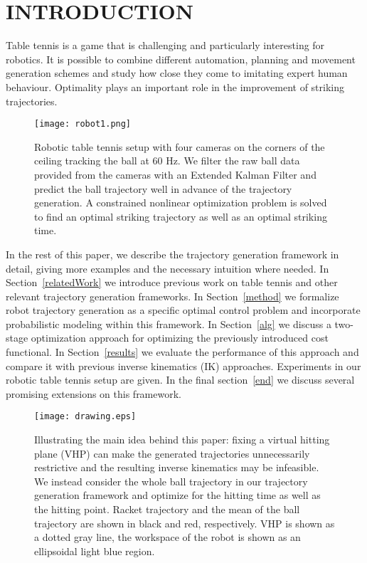 \section{INTRODUCTION}

Table tennis is a game that is challenging and particularly interesting for robotics. It is possible to combine different automation, planning and movement generation schemes and study how close they come to imitating expert human behaviour. Optimality plays an important role in the improvement of striking trajectories.

\begin{figure}[t!]
\center
\texttt{[image: robot1.png]}			
\caption{Robotic table tennis setup with four cameras on the corners of the ceiling tracking the ball at 60 Hz. We filter the raw ball data provided from the cameras with an Extended Kalman Filter and predict the ball trajectory well in advance of the trajectory generation. A constrained nonlinear optimization problem is solved to find an optimal striking trajectory as well as an optimal striking time.}
\label{robot}
\end{figure}

In the rest of this paper, we describe the trajectory generation framework in detail, giving more examples and the necessary intuition where needed. In Section~\ref{relatedWork} we introduce previous work on table tennis and other relevant trajectory generation frameworks. In Section~\ref{method} we formalize robot trajectory generation as a specific optimal control problem and incorporate probabilistic modeling within this framework. In Section~\ref{alg} we discuss a two-stage optimization approach for optimizing the previously introduced cost functional. In Section~\ref{results} we evaluate the performance of this approach and compare it with previous inverse kinematics (IK) approaches. Experiments in our robotic table tennis setup are given. In the final section~\ref{end} we discuss several promising extensions on this framework. %

\begin{figure}[t!]
\centering
\texttt{[image: drawing.eps]}			
\caption{Illustrating the main idea behind this paper: fixing a virtual hitting plane (VHP) can make the generated trajectories unnecessarily restrictive and the resulting inverse kinematics may be infeasible. We instead consider the whole ball trajectory in our trajectory generation framework and optimize for the hitting time as well as the hitting point. Racket trajectory and the mean of the ball trajectory are shown in black and red, respectively. VHP is shown as a dotted gray line, the workspace of the robot is shown as an ellipsoidal light blue region.}
\label{mainIdea}
\end{figure}